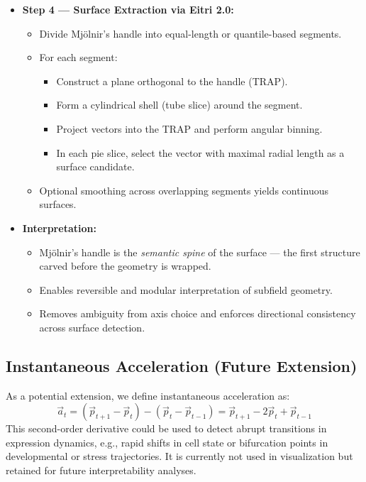 \documentclass{article}
\begin{document}
\begin{itemize}
  \item \textbf{Step 4 — Surface Extraction via Eitri 2.0:}
    \begin{itemize}
      \item Divide Mjölnir's handle into equal-length or quantile-based segments.
      \item For each segment:
        \begin{itemize}
          \item Construct a plane orthogonal to the handle (TRAP).
          \item Form a cylindrical shell (tube slice) around the segment.
          \item Project vectors into the TRAP and perform angular binning.
          \item In each pie slice, select the vector with maximal radial length as a surface candidate.
        \end{itemize}
      \item Optional smoothing across overlapping segments yields continuous surfaces.
    \end{itemize}

  \item \textbf{Interpretation:}
    \begin{itemize}
      \item Mjölnir’s handle is the \textit{semantic spine} of the surface — the first structure carved before the geometry is wrapped.
      \item Enables reversible and modular interpretation of subfield geometry.
      \item Removes ambiguity from axis choice and enforces directional consistency across surface detection.
    \end{itemize}
\end{itemize}

\subsection{Instantaneous Acceleration (Future Extension)}

As a potential extension, we define instantaneous acceleration as:
\[
\vec{a}_t = (\vec{p}_{t+1} - \vec{p}_t) - (\vec{p}_t - \vec{p}_{t-1}) = \vec{p}_{t+1} - 2\vec{p}_t + \vec{p}_{t-1}
\]
This second-order derivative could be used to detect abrupt transitions in expression dynamics, e.g., rapid shifts in cell state or bifurcation points in developmental or stress trajectories. It is currently not used in visualization but retained for future interpretability analyses.
\end{document}

